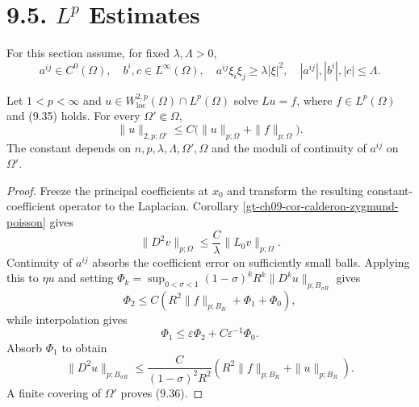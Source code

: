 \section*{9.5. $L^p$ Estimates}

For this section assume, for fixed $\lambda,\Lambda>0$,
\begin{equation}\tag{9.35}
a^{ij}\in C^0(\Omega),\quad b^i,c\in L^\infty(\Omega),\quad
a^{ij}\xi_i\xi_j\ge\lambda|\xi|^2,\quad
|a^{ij}|,|b^i|,|c|\le\Lambda.
\end{equation}

\begin{theorem}
\label{gt-ch09-thm-interior-w2p-estimate}
Let $1<p<\infty$ and
$u\in W^{2,p}_{\mathrm{loc}}(\Omega)\cap L^p(\Omega)$ solve $Lu=f$, where
$f\in L^p(\Omega)$ and (9.35) holds.  For every
$\Omega'\Subset\Omega$,
\begin{equation}\tag{9.36}
\|u\|_{2,p;\Omega'}\le
C\bigl(\|u\|_{p;\Omega}+\|f\|_{p;\Omega}\bigr).
\end{equation}
The constant depends on $n,p,\lambda,\Lambda,\Omega',\Omega$ and the moduli
of continuity of $a^{ij}$ on $\Omega'$.
\end{theorem}
\begin{proof}
\sketch Freeze the principal coefficients at $x_0$ and transform the resulting
constant-coefficient operator to the Laplacian.  Corollary
\ref{gt-ch09-cor-calderon-zygmund-poisson} gives
\begin{equation}
\tag{9.37}
\|D^2v\|_{p;\Omega}\leq\frac C\lambda\|L_0v\|_{p;\Omega}.
\end{equation}
Continuity of $a^{ij}$ absorbs the coefficient error on sufficiently small
balls. Applying this to $\eta u$ and setting
$\Phi_k=\sup_{0<\sigma<1}(1-\sigma)^kR^k
\|D^ku\|_{p;B_{\sigma R}}$ gives
\begin{equation}
\tag{9.38}
\Phi_2\leq C(R^2\|f\|_{p;B_R}+\Phi_1+\Phi_0),
\end{equation}
while interpolation gives
\begin{equation}
\tag{9.39}
\Phi_1\leq\varepsilon\Phi_2+C\varepsilon^{-1}\Phi_0.
\end{equation}
Absorb $\Phi_1$ to obtain
\begin{equation}\tag{9.40}
\|D^2u\|_{p;B_{\sigma R}}\le
\frac C{(1-\sigma)^2R^2}
\left(R^2\|f\|_{p;B_R}+\|u\|_{p;B_R}\right).
\end{equation}
A finite covering of $\Omega'$ proves (9.36).
\end{proof}

